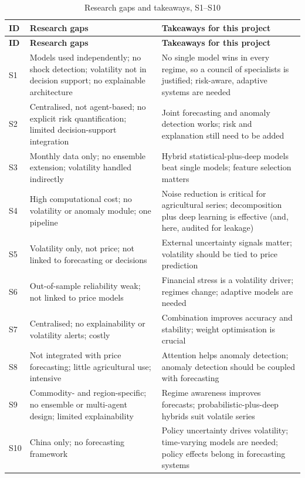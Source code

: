 {\footnotesize\setlength{\tabcolsep}{4pt}\renewcommand{\arraystretch}{1.15}
\begin{longtable}{|p{0.9cm}|p{6.4cm}|p{8.6cm}|}
\caption{Research gaps and takeaways, S1--S10}\label{tab:survey-g1}\\
\hline \textbf{ID} & \textbf{Research gaps} & \textbf{Takeaways for this project} \\ \hline \endfirsthead
\hline \textbf{ID} & \textbf{Research gaps} & \textbf{Takeaways for this project} \\ \hline \endhead
\hline \endfoot
S1 & Models used independently; no shock detection; volatility not in decision support; no explainable architecture & No single model wins in every regime, so a council of specialists is justified; risk-aware, adaptive systems are needed \\ \hline
S2 & Centralised, not agent-based; no explicit risk quantification; limited decision-support integration & Joint forecasting and anomaly detection works; risk and explanation still need to be added \\ \hline
S3 & Monthly data only; no ensemble extension; volatility handled indirectly & Hybrid statistical-plus-deep models beat single models; feature selection matters \\ \hline
S4 & High computational cost; no volatility or anomaly module; one pipeline & Noise reduction is critical for agricultural series; decomposition plus deep learning is effective (and, here, audited for leakage) \\ \hline
S5 & Volatility only, not price; not linked to forecasting or decisions & External uncertainty signals matter; volatility should be tied to price prediction \\ \hline
S6 & Out-of-sample reliability weak; not linked to price models & Financial stress is a volatility driver; regimes change; adaptive models are needed \\ \hline
S7 & Centralised; no explainability or volatility alerts; costly & Combination improves accuracy and stability; weight optimisation is crucial \\ \hline
S8 & Not integrated with price forecasting; little agricultural use; intensive & Attention helps anomaly detection; anomaly detection should be coupled with forecasting \\ \hline
S9 & Commodity- and region-specific; no ensemble or multi-agent design; limited explainability & Regime awareness improves forecasts; probabilistic-plus-deep hybrids suit volatile series \\ \hline
S10 & China only; no forecasting framework & Policy uncertainty drives volatility; time-varying models are needed; policy effects belong in forecasting systems \\ \hline
\end{longtable}}

